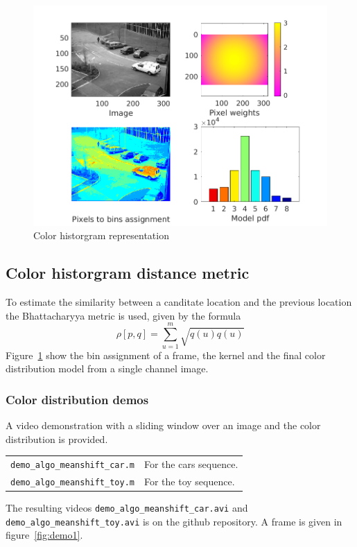 \documentclass[a4paper,12pt]{article}
\begin{document}
\begin{figure}[h]
        \centering
        \includegraphics{historgram.png}
        \caption{Color historgram representation}
		\label{fig:hist}
\end{figure}

\subsection{Color historgram distance metric}
To estimate the similarity between a canditate location and the previous location the  Bhattacharyya metric is used, given by the formula
$$
\rho[p,q] = \sum_{u=1}^m\sqrt{q(u)q(u)}
$$
Figure~\ref{fig:hist} show the bin assignment of a frame, the kernel and the final color distribution model from a single channel image.

\subsubsection{Color distribution demos}
A video demonstration with a sliding window over an image and the color distribution is provided. 

\begin{tabular}[h]{l l}
	\texttt{demo\_algo\_meanshift\_car.m} & For the cars sequence. \\
	\texttt{demo\_algo\_meanshift\_toy.m} & For the toy sequence. \\
\end{tabular}

\noindent The resulting videos \texttt{demo\_algo\_meanshift\_car.avi} and \texttt{demo\_algo\_meanshift\_toy.avi} is on the github repository. A frame is given in figure~\ref{fig:demo1}.
\end{document}
